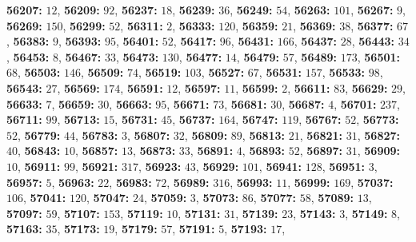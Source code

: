 \textsf{\bfseries 56207:} $12$, \textsf{\bfseries 56209:} $92$, \textsf{\bfseries 56237:} $18$, \textsf{\bfseries 56239:} $36$, \textsf{\bfseries 56249:} $54$, \textsf{\bfseries 56263:} $101$, \textsf{\bfseries 56267:} $9$, \textsf{\bfseries 56269:} $150$, \textsf{\bfseries 56299:} $52$, \textsf{\bfseries 56311:} $2$, \textsf{\bfseries 56333:} $120$, \textsf{\bfseries 56359:} $21$, \textsf{\bfseries 56369:} $38$, \textsf{\bfseries 56377:} $67$, \textsf{\bfseries 56383:} $9$, \textsf{\bfseries 56393:} $95$, \textsf{\bfseries 56401:} $52$, \textsf{\bfseries 56417:} $96$, \textsf{\bfseries 56431:} $166$, \textsf{\bfseries 56437:} $28$, \textsf{\bfseries 56443:} $34$, \textsf{\bfseries 56453:} $8$, \textsf{\bfseries 56467:} $33$, \textsf{\bfseries 56473:} $130$, \textsf{\bfseries 56477:} $14$, \textsf{\bfseries 56479:} $57$, \textsf{\bfseries 56489:} $173$, \textsf{\bfseries 56501:} $68$, \textsf{\bfseries 56503:} $146$, \textsf{\bfseries 56509:} $74$, \textsf{\bfseries 56519:} $103$, \textsf{\bfseries 56527:} $67$, \textsf{\bfseries 56531:} $157$, \textsf{\bfseries 56533:} $98$, \textsf{\bfseries 56543:} $27$, \textsf{\bfseries 56569:} $174$, \textsf{\bfseries 56591:} $12$, \textsf{\bfseries 56597:} $11$, \textsf{\bfseries 56599:} $2$, \textsf{\bfseries 56611:} $83$, \textsf{\bfseries 56629:} $29$, \textsf{\bfseries 56633:} $7$, \textsf{\bfseries 56659:} $30$, \textsf{\bfseries 56663:} $95$, \textsf{\bfseries 56671:} $73$, \textsf{\bfseries 56681:} $30$, \textsf{\bfseries 56687:} $4$, \textsf{\bfseries 56701:} $237$, \textsf{\bfseries 56711:} $99$, \textsf{\bfseries 56713:} $15$, \textsf{\bfseries 56731:} $45$, \textsf{\bfseries 56737:} $164$, \textsf{\bfseries 56747:} $119$, \textsf{\bfseries 56767:} $52$, \textsf{\bfseries 56773:} $52$, \textsf{\bfseries 56779:} $44$, \textsf{\bfseries 56783:} $3$, \textsf{\bfseries 56807:} $32$, \textsf{\bfseries 56809:} $89$, \textsf{\bfseries 56813:} $21$, \textsf{\bfseries 56821:} $31$, \textsf{\bfseries 56827:} $40$, \textsf{\bfseries 56843:} $10$, \textsf{\bfseries 56857:} $13$, \textsf{\bfseries 56873:} $33$, \textsf{\bfseries 56891:} $4$, \textsf{\bfseries 56893:} $52$, \textsf{\bfseries 56897:} $31$, \textsf{\bfseries 56909:} $10$, \textsf{\bfseries 56911:} $99$, \textsf{\bfseries 56921:} $317$, \textsf{\bfseries 56923:} $43$, \textsf{\bfseries 56929:} $101$, \textsf{\bfseries 56941:} $128$, \textsf{\bfseries 56951:} $3$, \textsf{\bfseries 56957:} $5$, \textsf{\bfseries 56963:} $22$, \textsf{\bfseries 56983:} $72$, \textsf{\bfseries 56989:} $316$, \textsf{\bfseries 56993:} $11$, \textsf{\bfseries 56999:} $169$, \textsf{\bfseries 57037:} $106$, \textsf{\bfseries 57041:} $120$, \textsf{\bfseries 57047:} $24$, \textsf{\bfseries 57059:} $3$, \textsf{\bfseries 57073:} $86$, \textsf{\bfseries 57077:} $58$, \textsf{\bfseries 57089:} $13$, \textsf{\bfseries 57097:} $59$, \textsf{\bfseries 57107:} $153$, \textsf{\bfseries 57119:} $10$, \textsf{\bfseries 57131:} $31$, \textsf{\bfseries 57139:} $23$, \textsf{\bfseries 57143:} $3$, \textsf{\bfseries 57149:} $8$, \textsf{\bfseries 57163:} $35$, \textsf{\bfseries 57173:} $19$, \textsf{\bfseries 57179:} $57$, \textsf{\bfseries 57191:} $5$, \textsf{\bfseries 57193:} $17$, 
